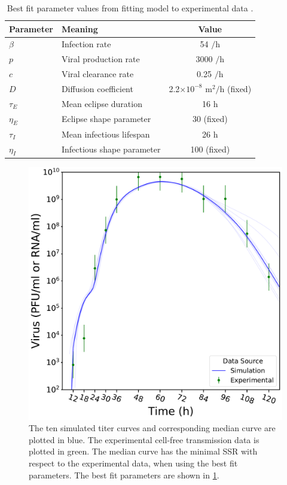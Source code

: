 \begin{table}
\centering
\caption{Best fit parameter values from fitting model to experimental data \cite{pinilla12}. \label{tab_datafit_params}}
\begin{tabular}{llc}
\hline
Parameter & Meaning & Value \\
\hline
$\beta$ & Infection rate & 54 $/\mathrm{h}$ \\
$p$ & Viral production rate & 3000 $/\mathrm{h}$ \\
$c$ & Viral clearance rate & 0.25 $/\mathrm{h}$ \\
$D$ & Diffusion coefficient & 2.2$\times 10^{-8}$ $\mathrm{m}^2/\mathrm{h}$ (fixed) \\
$\tau_E$ & Mean eclipse duration & 16 $\mathrm{h}$ \\
$\eta_E$ & Eclipse shape parameter & 30 (fixed) \\
$\tau_I$ & Mean infectious lifespan & 26 $\mathrm{h}$ \\
$\eta_I$ & Infectious shape parameter & 100 (fixed) \\
\end{tabular}
\end{table}

\begin{figure}
\centering
    \includegraphics[width=0.6\linewidth]{Figures/DataFit.pdf}
\caption{The ten simulated titer curves and corresponding median curve are plotted in blue. The experimental cell-free transmission data \cite{pinilla12} is plotted in green. The median curve has the minimal SSR with respect to the experimental data, when using the best fit parameters. The best fit parameters are shown in \ref{tab_datafit_params}. \label{fig_DataFit}}
\end{figure}

